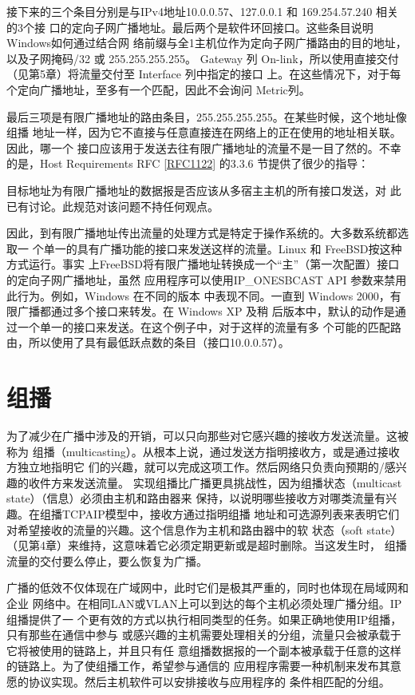 接下来的三个条目分别是与IPv4地址10.0.0.57、127.0.0.1 和 169.254.57.240 相关的3个接
口的定向子网广播地址。最后两个是软件环回接口。这些条目说明Windows如何通过结合网
络前缀与全1主机位作为定向子网广播路由的目的地址，以及子网掩码/32 或 255.255.255.255。
Gateway 列 On-link，所以使用直接交付（见第5章）将流量交付至 Interface 列中指定的接口
上。在这些情况下，对于每个定向广播地址，至多有一个匹配，因此不会询问 Metric列。

最后三项是有限广播地址的路由条目，255.255.255.255。在某些时候，这个地址像组播
地址一样，因为它不直接与任意直接连在网络上的正在使用的地址相关联。因此，哪一个
接口应该用于发送去往有限广播地址的流量不是一目了然的。不幸的是，Host Requirements
RFC \href{https://www.rfc-editor.org/rfc/rfc1122}{[RFC1122]} 的3.3.6 节提供了很少的指导：

\begin{tcolorbox}
  目标地址为有限广播地址的数据报是否应该从多宿主主机的所有接口发送，对
  此已有讨论。此规范对该问题不持任何观点。
\end{tcolorbox}

因此，到有限广播地址传出流量的处理方式是特定于操作系统的。大多数系统都选取一
个单一的具有广播功能的接口来发送这样的流量。Linux 和 FreeBSD按这种方式运行。事实
上FreeBSD将有限广播地址转换成一个“主”（第一次配置）接口的定向子网广播地址，虽然
应用程序可以使用IP\_ONESBCAST API 参数来禁用此行为。例如，Windows 在不同的版本
中表现不同。一直到 Windows 2000，有限广播都通过多个接口来转发。在 Windows XP 及稍
后版本中，默认的动作是通过一个单一的接口来发送。在这个例子中，对于这样的流量有多
个可能的匹配路由，所以使用了具有最低跃点数的条目（接口10.0.0.57）。

\section{组播}
为了减少在广播中涉及的开销，可以只向那些对它感兴趣的接收方发送流量。这被称为
组播（multicasting）。从根本上说，通过发送方指明接收方，或是通过接收方独立地指明它
们的兴趣，就可以完成这项工作。然后网络只负责向预期的/感兴趣的收件方来发送流量。
实现组播比广播更具挑战性，因为组播状态（multicast state）（信息）必须由主机和路由器来
保持，以说明哪些接收方对哪类流量有兴趣。在组播TCPAIP模型中，接收方通过指明组播
地址和可选源列表来表明它们对希望接收的流量的兴趣。这个信息作为主机和路由器中的软
状态（soft state）（见第4章）来维持，这意味着它必须定期更新或是超时删除。当这发生时，
组播流量的交付要么停止，要么恢复为广播。

广播的低效不仅体现在广域网中，此时它们是极其严重的，同时也体现在局域网和企业
网络中。在相同LAN或VLAN上可以到达的每个主机必须处理广播分组。IP 组播提供了一
个更有效的方式以执行相同类型的任务。如果正确地使用IP组播，只有那些在通信中参与
或感兴趣的主机需要处理相关的分组，流量只会被承载于它将被使用的链路上，并且只有任
意组播数据报的一个副本被承载于任意的这样的链路上。为了使组播工作，希望参与通信的
应用程序需要一种机制来发布其意愿的协议实现。然后主机软件可以安排接收与应用程序的
条件相匹配的分组。

